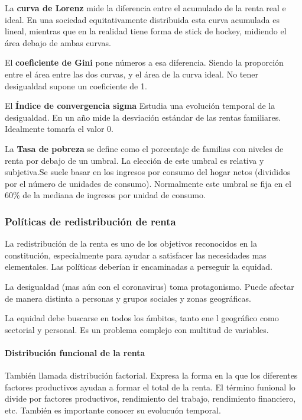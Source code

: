         La \textbf{curva de Lorenz} mide la diferencia entre el acumulado de la renta real e ideal. En una sociedad equitativamente distribuida esta curva acumulada es lineal, mientras que en la realidad tiene forma de stick de hockey, midiendo el área debajo de ambas curvas.

        El \textbf{coeficiente de Gini} pone números a esa diferencia. Siendo la proporción entre el área entre las dos curvas, y el área de la curva ideal. No tener desigualdad supone un coeficiente de 1.

        El \textbf{Índice de convergencia sigma} Estudia una evolución temporal de la desigualdad. En un año mide la desviación estándar de las rentas familiares. Idealmente tomaría el valor 0.

        La \textbf{Tasa de pobreza} se define como el porcentaje de familias con niveles de renta por debajo de un umbral. La elección de este umbral es relativa y subjetiva.Se suele basar en los ingresos por consumo del hogar netos (divididos por el número de unidades de consumo). Normalmente este umbral se fija en el 60\% de la mediana de ingresos por unidad de consumo.

    \subsubsection{Políticas de redistribución de renta}
        La redistribución de la renta es uno de los objetivos reconocidos en la constitución, especialmente para ayudar a satisfacer las necesidades mas elementales. Las políticas deberían ir encaminadas a perseguir la equidad.

        La desigualdad (mas aún con el coronavirus) toma protagonismo. Puede afectar de manera distinta a personas y grupos sociales y zonas geográficas.
        
        La equidad debe buscarse en todos los ámbitos, tanto ene l geográfico como sectorial y personal. Es un problema complejo con multitud de variables.

        \paragraph{Distribución funcional de la renta}
            También llamada distribución factorial. Expresa la forma en la que los diferentes factores productivos ayudan a formar el total de la renta. El término funional lo divide por factores productivos, rendimiento del trabajo, rendimiento financiero, etc. También es importante conocer su evolucuón temporal. 
            
